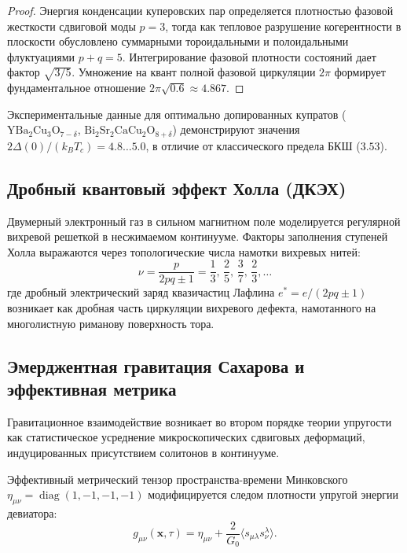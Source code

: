 \documentclass[12pt,a4paper]{article}
\theoremstyle{definition}
\theoremstyle{remark}
\begin{document}
\begin{proof}
	Энергия конденсации куперовских пар определяется плотностью фазовой жесткости сдвиговой моды $p=3$, тогда как тепловое разрушение когерентности в плоскости обусловлено суммарными тороидальными и полоидальными флуктуациями $p+q=5$. Интегрирование фазовой плотности состояний дает фактор $\sqrt{3/5}$. Умножение на квант полной фазовой циркуляции $2\pi$ формирует фундаментальное отношение $2\pi\sqrt{0.6} \approx 4.867$.
\end{proof}
Экспериментальные данные для оптимально допированных купратов ($\mathrm{YBa}_2\mathrm{Cu}_3\mathrm{O}_{7-\delta}$, $\mathrm{Bi}_2\mathrm{Sr}_2\mathrm{CaCu}_2\mathrm{O}_{8+\delta}$) демонстрируют значения $2\Delta(0)/(k_B T_c) = 4.8 \dots 5.0$, в отличие от классического предела БКШ ($3.53$).

\subsection{Дробный квантовый эффект Холла (ДКЭХ)}
Двумерный электронный газ в сильном магнитном поле моделируется регулярной вихревой решеткой в несжимаемом континууме. Факторы заполнения ступеней Холла выражаются через топологические числа намотки вихревых нитей:
\begin{equation}
	\nu = \frac{p}{2p q \pm 1} = \frac{1}{3}, \, \frac{2}{5}, \, \frac{3}{7}, \, \frac{2}{3}, \dots
	\label{eq:fqhe_fillings}
\end{equation}
где дробный электрический заряд квазичастиц Лафлина $e^* = e / (2pq \pm 1)$ возникает как дробная часть циркуляции вихревого дефекта, намотанного на многолистную риманову поверхность тора.

\subsection{Эмерджентная гравитация Сахарова и эффективная метрика}
Гравитационное взаимодействие возникает во втором порядке теории упругости как статистическое усреднение микроскопических сдвиговых деформаций, индуцированных присутствием солитонов в континууме.

Эффективный метрический тензор пространства-времени Минковского $\eta_{\mu\nu} = \operatorname{diag}(1, -1, -1, -1)$ модифицируется следом плотности упругой энергии девиатора:
\begin{equation}
	g_{\mu\nu}(\mathbf{x}, \tau) = \eta_{\mu\nu} + \frac{2}{G_0} \langle s_{\mu\lambda} s^\lambda_\nu \rangle.
	\label{eq:emergent_metric}
\end{equation}
\end{document}
